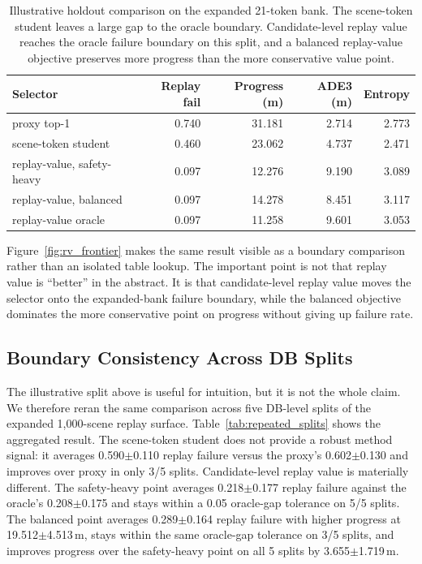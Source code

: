 \documentclass{article}
\begin{document}
\begin{table}[t]
\centering
\caption{Illustrative holdout comparison on the expanded 21-token bank. The scene-token
student leaves a large gap to the oracle boundary. Candidate-level replay value reaches
the oracle failure boundary on this split, and a balanced replay-value objective preserves
more progress than the more conservative value point.}
\label{tab:student_compare}
\footnotesize
\begin{tabular}{lrrrr}
\toprule
Selector & Replay fail & Progress (m) & ADE3 (m) & Entropy \\
\midrule
proxy top-1 & 0.740 & 31.181 & 2.714 & 2.773 \\
scene-token student & 0.460 & 23.062 & 4.737 & 2.471 \\
replay-value, safety-heavy & 0.097 & 12.276 & 9.190 & 3.089 \\
replay-value, balanced & 0.097 & 14.278 & 8.451 & 3.117 \\
replay-value oracle & 0.097 & 11.258 & 9.601 & 3.053 \\
\bottomrule
\end{tabular}
\end{table}

Figure~\ref{fig:rv_frontier} makes the same result visible as a boundary comparison rather
than an isolated table lookup. The important point is not that replay value is ``better''
in the abstract. It is that candidate-level replay value moves the selector onto the
expanded-bank failure boundary, while the balanced objective dominates the more
conservative point on progress without giving up failure rate.

\subsection{Boundary Consistency Across DB Splits}
\label{sec:exp:boundary_consistency}

The illustrative split above is useful for intuition, but it is not the whole claim. We
therefore reran the same comparison across five DB-level splits of the expanded
1,000-scene replay surface. Table~\ref{tab:repeated_splits} shows the aggregated result.
The scene-token student does not provide a robust method signal: it averages
0.590$\pm$0.110 replay failure versus the proxy's 0.602$\pm$0.130 and improves over proxy
in only 3/5 splits. Candidate-level replay value is materially different. The
safety-heavy point averages 0.218$\pm$0.177 replay failure against the oracle's
0.208$\pm$0.175 and stays within a 0.05 oracle-gap tolerance on 5/5 splits. The balanced
point averages 0.289$\pm$0.164 replay failure with higher progress at
19.512$\pm$4.513\,m, stays within the same oracle-gap tolerance on 3/5 splits, and
improves progress over the safety-heavy point on all 5 splits by 3.655$\pm$1.719\,m.
\end{document}
